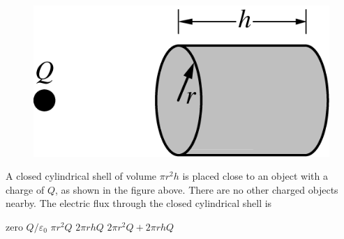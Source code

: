 \begin{figure}[H]
    \centering
    \includegraphics[scale=0.3]{images/img-012-027.png}
\end{figure}

\begin{questions}\setcounter{question}{25}\question
A closed cylindrical shell of volume $\pi r^{2} h$ is placed close to an object with a charge of $Q$, as shown in the figure above. There are no other charged objects nearby. The electric flux through the closed cylindrical shell is

\begin{oneparchoices}
\choice zero
\choice $Q / \varepsilon_{0}$
\choice $\pi r^{2} Q$
\choice $2 \pi r h Q$
\choice $2 \pi r^{2} Q+2 \pi r h Q$
\end{oneparchoices}\end{questions}
